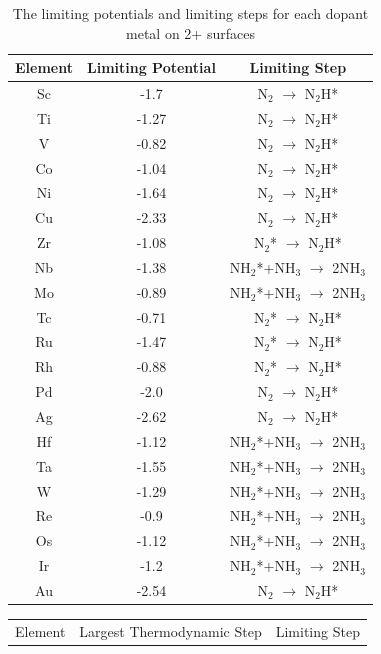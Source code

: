 \documentclass[journal=jacsat,manuscript=article]{achemso}
\begin{document}
\begin{table}
\begin{center}
\begin{tabular}{| c | c |c |}
\hline
Element & Limiting Potential & Limiting Step \\
\hline
Sc & -1.7 & N$_2$ $\rightarrow$ N$_2$H*\\
Ti & -1.27 & N$_2$ $\rightarrow$ N$_2$H*\\
V & -0.82 & N$_2$ $\rightarrow$ N$_2$H*\\
Co & -1.04 & N$_2$ $\rightarrow$ N$_2$H*\\
Ni & -1.64 & N$_2$ $\rightarrow$ N$_2$H*\\
Cu & -2.33 & N$_2$ $\rightarrow$ N$_2$H*\\
Zr & -1.08 & N$_2$* $\rightarrow$ N$_2$H*\\
Nb & -1.38 & NH$_2$*+NH$_3$ $\rightarrow$ 2NH$_3$\\
Mo & -0.89 & NH$_2$*+NH$_3$ $\rightarrow$ 2NH$_3$\\
Tc & -0.71 & N$_2$* $\rightarrow$ N$_2$H*\\
Ru & -1.47 & N$_2$* $\rightarrow$ N$_2$H*\\
Rh & -0.88 & N$_2$* $\rightarrow$ N$_2$H*\\
Pd & -2.0 & N$_2$ $\rightarrow$ N$_2$H*\\
Ag & -2.62 & N$_2$ $\rightarrow$ N$_2$H*\\
Hf & -1.12 & NH$_2$*+NH$_3$ $\rightarrow$ 2NH$_3$\\
Ta & -1.55 & NH$_2$*+NH$_3$ $\rightarrow$ 2NH$_3$\\
W & -1.29 & NH$_2$*+NH$_3$ $\rightarrow$ 2NH$_3$\\
Re & -0.9 & NH$_2$*+NH$_3$ $\rightarrow$ 2NH$_3$\\
Os & -1.12 & NH$_2$*+NH$_3$ $\rightarrow$ 2NH$_3$\\
Ir & -1.2 & NH$_2$*+NH$_3$ $\rightarrow$ 2NH$_3$\\
Au & -2.54 & N$_2$ $\rightarrow$ N$_2$H*\\
\hline
\end{tabular}
\end{center}
\caption{The limiting potentials and limiting steps for each dopant metal on 2+ surfaces}\label{table:pot_limiting_steps}\end{table}\begin{table}
\begin{center}
\begin{tabular}{| c | c |c |}
\hline
Element & Largest Thermodynamic Step & Limiting Step \\

\end{tabular}
\end{center}
\end{table}
\end{document}

